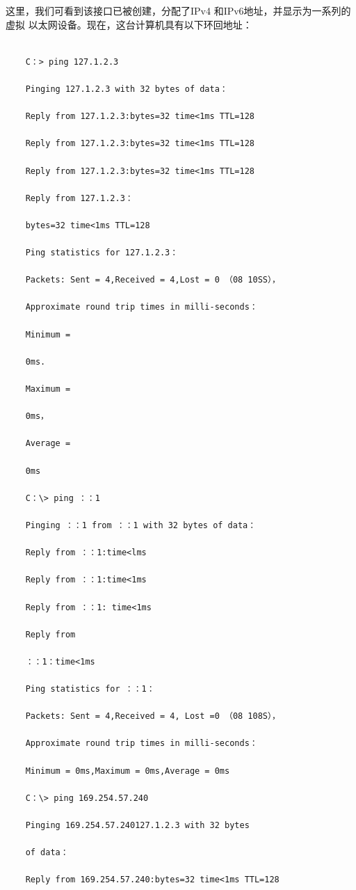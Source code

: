 这里，我们可看到该接口已被创建，分配了IPv4 和IPv6地址，并显示为一系列的虚拟
以太网设备。现在，这台计算机具有以下环回地址：
\begin{verbatim}
    
    C：> ping 127.1.2.3
    
    Pinging 127.1.2.3 with 32 bytes of data：
    
    Reply from 127.1.2.3:bytes=32 time<1ms TTL=128
    
    Reply from 127.1.2.3:bytes=32 time<1ms TTL=128
    
    Reply from 127.1.2.3:bytes=32 time<1ms TTL=128
    
    Reply from 127.1.2.3：
    
    bytes=32 time<1ms TTL=128
    
    Ping statistics for 127.1.2.3：
    
    Packets: Sent = 4,Received = 4,Lost = 0 （08 10SS），
    
    Approximate round trip times in milli-seconds：
    
    Minimum =
    
    0ms.
    
    Maximum =
    
    0ms，
    
    Average =
    
    0ms
    
    C：\> ping ：：1
    
    Pinging ：：1 from ：：1 with 32 bytes of data：
    
    Reply from ：：1:time<lms
    
    Reply from ：：1:time<1ms
    
    Reply from ：：1: time<1ms
    
    Reply from
    
    ：：1：time<1ms
    
    Ping statistics for ：：1：
    
    Packets: Sent = 4,Received = 4, Lost =0 （08 108S），
    
    Approximate round trip times in milli-seconds：
    
    Minimum = 0ms,Maximum = 0ms,Average = 0ms
    
    C：\> ping 169.254.57.240
    
    Pinging 169.254.57.240127.1.2.3 with 32 bytes
    
    of data：
    
    Reply from 169.254.57.240:bytes=32 time<1ms TTL=128
    

\end{verbatim}

